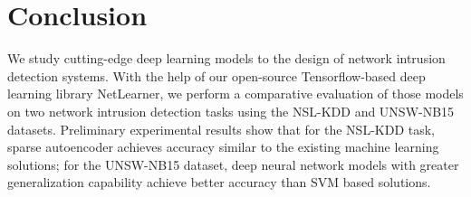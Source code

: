 \section{Conclusion}
We study cutting-edge deep learning models to the design of network intrusion detection systems.
With the help of our open-source Tensorflow-based deep learning library NetLearner, we perform a comparative evaluation of those models on two network intrusion detection tasks using the NSL-KDD and UNSW-NB15 datasets. Preliminary experimental results show that for the NSL-KDD task, sparse autoencoder achieves accuracy similar to the existing machine learning solutions; for the UNSW-NB15 dataset, deep neural network models with greater generalization capability achieve better accuracy than SVM based solutions.